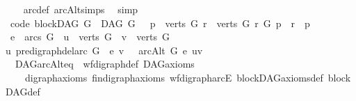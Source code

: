 \begin{isabellebody}
%
\isadelimproof
\ \ %
\endisadelimproof
%
\isatagproof
{}\isamarkupfalse%
\ arc{\isacharunderscore}{\kern0pt}def\ arcAlt{\isachardot}{\kern0pt}simps\ \isamarkupfalse%
\ simp%
\endisatagproof
{\isafoldproof}%
%
\isadelimproof
\isanewline
%
\endisadelimproof
\isanewline
{}\isamarkupfalse%
\ {\isacharbrackleft}{\kern0pt}code{\isacharbrackright}{\kern0pt}{\isacharcolon}{\kern0pt}\ {\isachardoublequoteopen}blockDAG\ G\ {\isacharequal}{\kern0pt}\ {\isacharparenleft}{\kern0pt}DAG\ G\ {\isasymand}\ {\isacharparenleft}{\kern0pt}{\isacharparenleft}{\kern0pt}{\isasymexists}\ p\ {\isasymin}\ verts\ G{\isachardot}{\kern0pt}\ {\isacharparenleft}{\kern0pt}{\isacharparenleft}{\kern0pt}{\isasymforall}r\ {\isasymin}\ verts\ G{\isachardot}{\kern0pt}\ {\isacharparenleft}{\kern0pt}r\ {\isasymrightarrow}\isactrlsup {\isacharplus}{\kern0pt}\isactrlbsub G\isactrlesub \ p\ {\isasymor}\ r\ {\isacharequal}{\kern0pt}\ p{\isacharparenright}{\kern0pt}{\isacharparenright}{\kern0pt}{\isacharparenright}{\kern0pt}{\isacharparenright}{\kern0pt}\ {\isasymand}\isanewline
\ {\isacharparenleft}{\kern0pt}{\isasymforall}e\ {\isasymin}\ {\isacharparenleft}{\kern0pt}arcs\ G{\isacharparenright}{\kern0pt}{\isachardot}{\kern0pt}\ {\isasymforall}\ u\ {\isasymin}\ verts\ G{\isachardot}{\kern0pt}\ {\isasymforall}\ v\ {\isasymin}\ verts\ G{\isachardot}{\kern0pt}\ \isanewline
{\isacharparenleft}{\kern0pt}u\ {\isasymrightarrow}\isactrlsup {\isacharplus}{\kern0pt}\isactrlbsub {\isacharparenleft}{\kern0pt}pre{\isacharunderscore}{\kern0pt}digraph{\isachardot}{\kern0pt}del{\isacharunderscore}{\kern0pt}arc\ G\ \ e{\isacharparenright}{\kern0pt}\isactrlesub \ v{\isacharparenright}{\kern0pt}\ {\isasymlongrightarrow}\ {\isasymnot}\ arcAlt\ G\ e\ {\isacharparenleft}{\kern0pt}u{\isacharcomma}{\kern0pt}v{\isacharparenright}{\kern0pt}{\isacharparenright}{\kern0pt}{\isacharparenright}{\kern0pt}{\isacharparenright}{\kern0pt}{\isachardoublequoteclose}\ \isanewline
%
\isadelimproof
\ \ %
\endisadelimproof
%
\isatagproof
{}\isamarkupfalse%
\ \ DAG{\isachardot}{\kern0pt}arcAlt{\isacharunderscore}{\kern0pt}eq\ \ wf{\isacharunderscore}{\kern0pt}digraph{\isacharunderscore}{\kern0pt}def\ DAG{\isachardot}{\kern0pt}axioms{\isacharparenleft}{\kern0pt}{}{\isacharparenright}{\kern0pt}\isanewline
\ \ \ \ digraph{\isachardot}{\kern0pt}axioms{\isacharparenleft}{\kern0pt}{}{\isacharparenright}{\kern0pt}\ fin{\isacharunderscore}{\kern0pt}digraph{\isachardot}{\kern0pt}axioms{\isacharparenleft}{\kern0pt}{}{\isacharparenright}{\kern0pt}\ wf{\isacharunderscore}{\kern0pt}digraph{\isachardot}{\kern0pt}arcE\ blockDAG{\isacharunderscore}{\kern0pt}axioms{\isacharunderscore}{\kern0pt}def\ blockDAG{\isacharunderscore}{\kern0pt}def\ \isanewline

\end{isabellebody}
